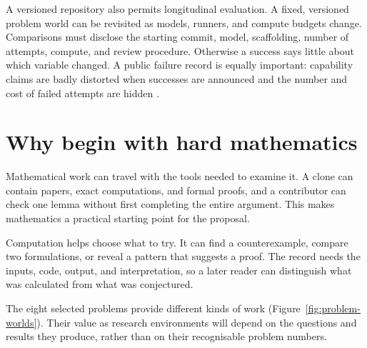 \documentclass[10pt]{article}
\begin{document}
A versioned repository also permits longitudinal evaluation.  A fixed,
versioned problem world can be revisited as models, runners, and compute
budgets change.  Comparisons must disclose the starting commit, model,
scaffolding, number of attempts, compute, and review procedure.  Otherwise a
success says little about which variable changed.  A public failure record is
equally important: capability claims are badly distorted when successes are
announced and the number and cost of failed attempts are hidden
\cite{tao2026}.

\section{Why begin with hard mathematics}\label{sec:math}

Mathematical work can travel with the tools needed to examine it. A clone can
contain papers, exact computations, and formal proofs, and a contributor can
check one lemma without first completing the entire argument. This makes
mathematics a practical starting point for the proposal.

Computation helps choose what to try. It can find a counterexample, compare
two formulations, or reveal a pattern that suggests a proof. The record needs
the inputs, code, output, and interpretation, so a later reader can distinguish
what was calculated from what was conjectured.

The eight selected problems provide different kinds of work
(Figure~\ref{fig:problem-worlds}). Their value as research environments will
depend on the questions and results they produce, rather than on their
recognisable problem numbers.
\end{document}
